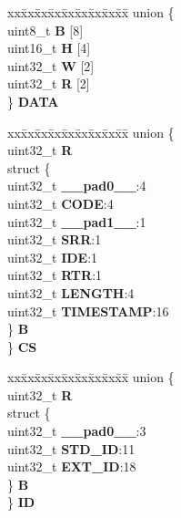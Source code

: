 \begin{DoxyCompactItemize}
\begin{tabbing}
\end{tabbing}\item 
\mbox{\label{structFLEXCAN2__tag_1_1canbuf__t_a306294a13809a277af7b9c9e4c18828e}} 
\begin{tabbing}
xx\=xx\=xx\=xx\=xx\=xx\=xx\=xx\=xx\=\kill
union \{\\
\>uint8\_t {\bfseries B} \mbox{[}8\mbox{]}\\
\>uint16\_t {\bfseries H} \mbox{[}4\mbox{]}\\
\>uint32\_t {\bfseries W} \mbox{[}2\mbox{]}\\
\>uint32\_t {\bfseries R} \mbox{[}2\mbox{]}\\
\} {\bfseries DATA}\\

\end{tabbing}\item 
\mbox{\label{structFLEXCAN2__tag_1_1canbuf__t_aa6db945ce844f4af564795d2541cc91c}} 
\begin{tabbing}
xx\=xx\=xx\=xx\=xx\=xx\=xx\=xx\=xx\=\kill
union \{\\
\>uint32\_t {\bfseries R}\\
\>struct \{\\
\>\>uint32\_t {\bfseries \_\_pad0\_\_}:4\\
\>\>uint32\_t {\bfseries CODE}:4\\
\>\>uint32\_t {\bfseries \_\_pad1\_\_}:1\\
\>\>uint32\_t {\bfseries SRR}:1\\
\>\>uint32\_t {\bfseries IDE}:1\\
\>\>uint32\_t {\bfseries RTR}:1\\
\>\>uint32\_t {\bfseries LENGTH}:4\\
\>\>uint32\_t {\bfseries TIMESTAMP}:16\\
\>\} {\bfseries B}\\
\} {\bfseries CS}\\

\end{tabbing}\item 
\mbox{\label{structFLEXCAN2__tag_1_1canbuf__t_a9007e0bc79714fb9d85dd1ee4b34fee1}} 
\begin{tabbing}
xx\=xx\=xx\=xx\=xx\=xx\=xx\=xx\=xx\=\kill
union \{\\
\>uint32\_t {\bfseries R}\\
\>struct \{\\
\>\>uint32\_t {\bfseries \_\_pad0\_\_}:3\\
\>\>uint32\_t {\bfseries STD\_ID}:11\\
\>\>uint32\_t {\bfseries EXT\_ID}:18\\
\>\} {\bfseries B}\\
\} {\bfseries ID}\\


\end{tabbing}
\end{DoxyCompactItemize}

